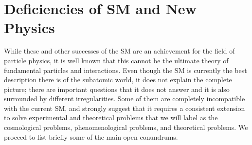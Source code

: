 \section{Deficiencies of SM and New Physics}
While these and other successes of the SM are an achievement for the field of particle physics, it is well known that this cannot be the ultimate theory of fundamental particles and interactions. Even though the SM is currently the best description there is of the subatomic world, it does not explain the complete picture; there are important questions that it does not answer and it is also surrounded by different irregularities. Some of them are completely incompatible with the current SM, and strongly suggest that it requires a consistent extension to solve experimental and theoretical problems that we will label as the cosmological problems, phenomenological problems, and theoretical problems. We proceed to  list briefly some of the main open conundrums.

